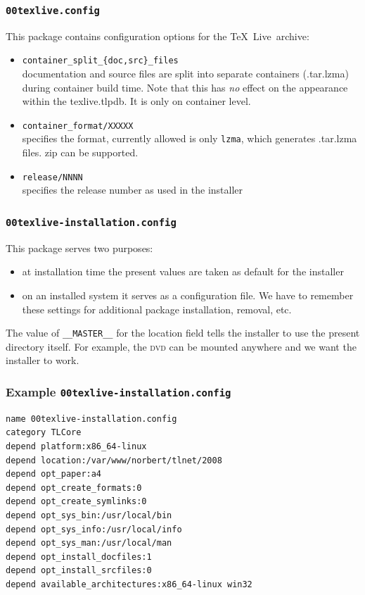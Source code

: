 \documentclass{beamer}
\newcommand{\tl}{\TeX~Live}
\newcommand{\acro}[1]{\textsc{\MakeLowercase{#1}}}
\begin{document}
\begin{frame}
  \frametitle{\texttt{00texlive.config}}
  This package contains configuration options for the \tl\ archive:
  \begin{itemize}
  \item \texttt{container\_split\_\{doc,src\}\_files}\\
    documentation and source files are split into separate containers
    (.tar.lzma) during container build time. Note that this has
    \emph{no} effect on the appearance within the texlive.tlpdb. It is
    only on container level.
  \item \texttt{container\_format/XXXXX}\\
    specifies the format, currently allowed is only \texttt{lzma}, which
    generates .tar.lzma files. zip can be supported. 
  \item \texttt{release/NNNN}\\
    specifies the release number as used in the installer
  \end{itemize}
\end{frame}

\begin{frame}
  \frametitle{\texttt{00texlive-installation.config}}
  This package serves two purposes:
  \begin{itemize}
  \item at installation time the present values are taken as default for
    the installer
  \item on an installed system it serves as a configuration file.
    We have to remember these settings for additional package
    installation, removal, etc.
  \end{itemize}
  The value of \texttt{\_\_MASTER\_\_} for the location field tells the
  installer to use the present directory itself.  For example,
  the \acro{DVD} can be mounted anywhere and we want the installer to work.
\end{frame}

\begin{frame}[fragile]
  \frametitle{Example \texttt{00texlive-installation.config}}
  \begin{lstlisting}[basicstyle=\ttfamily\small]
name 00texlive-installation.config
category TLCore
depend platform:x86_64-linux
depend location:/var/www/norbert/tlnet/2008
depend opt_paper:a4
depend opt_create_formats:0
depend opt_create_symlinks:0
depend opt_sys_bin:/usr/local/bin
depend opt_sys_info:/usr/local/info
depend opt_sys_man:/usr/local/man
depend opt_install_docfiles:1
depend opt_install_srcfiles:0
depend available_architectures:x86_64-linux win32
\end{lstlisting}
\end{frame}
\end{document}
